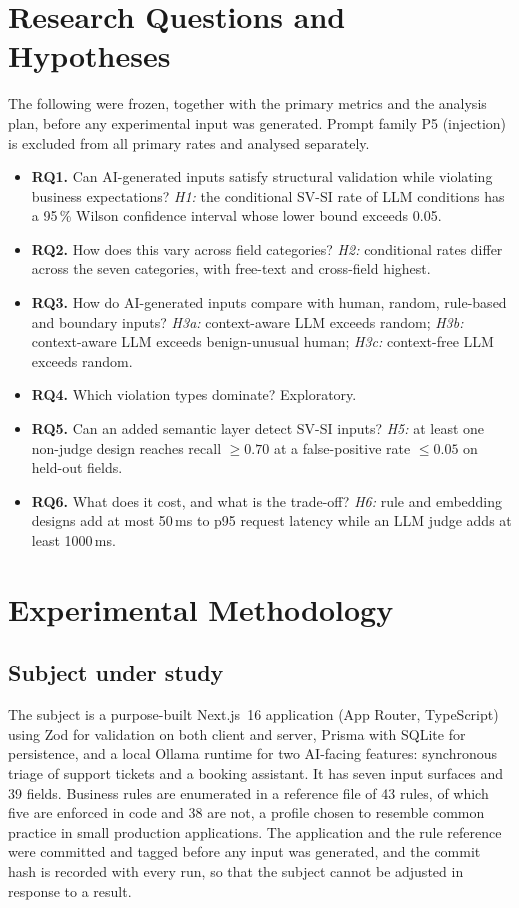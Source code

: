 \documentclass[conference]{IEEEtran}
\begin{document}
\section{Research Questions and Hypotheses}
\label{sec:rq}

The following were frozen, together with the primary metrics and the analysis plan, before any
experimental input was generated. Prompt family P5 (injection) is excluded from all primary rates and
analysed separately.

\begin{itemize}
  \item \textbf{RQ1.} Can AI-generated inputs satisfy structural validation while violating
  business expectations? \emph{H1:} the conditional SV-SI rate of LLM conditions has a 95\,\% Wilson
  confidence interval whose lower bound exceeds 0.05.
  \item \textbf{RQ2.} How does this vary across field categories? \emph{H2:} conditional rates
  differ across the seven categories, with free-text and cross-field highest.
  \item \textbf{RQ3.} How do AI-generated inputs compare with human, random, rule-based and boundary
  inputs? \emph{H3a:} context-aware LLM exceeds random; \emph{H3b:} context-aware LLM exceeds
  benign-unusual human; \emph{H3c:} context-free LLM exceeds random.
  \item \textbf{RQ4.} Which violation types dominate? Exploratory.
  \item \textbf{RQ5.} Can an added semantic layer detect SV-SI inputs? \emph{H5:} at least one
  non-judge design reaches recall $\geq 0.70$ at a false-positive rate $\leq 0.05$ on held-out
  fields.
  \item \textbf{RQ6.} What does it cost, and what is the trade-off? \emph{H6:} rule and embedding
  designs add at most 50\,ms to p95 request latency while an LLM judge adds at least 1000\,ms.
\end{itemize}

\section{Experimental Methodology}
\label{sec:method}

\subsection{Subject under study}
The subject is a purpose-built Next.js~16 application (App Router, TypeScript) using Zod for
validation on both client and server, Prisma with SQLite for persistence, and a local Ollama runtime
for two AI-facing features: synchronous triage of support tickets and a booking assistant. It has
seven input surfaces and 39 fields. Business rules are enumerated in a reference file of 43 rules, of
which five are enforced in code and 38 are not, a profile chosen to resemble common practice in small
production applications. The application and the rule reference were committed and tagged before any
input was generated, and the commit hash is recorded with every run, so that the subject cannot be
adjusted in response to a result.
\end{document}
